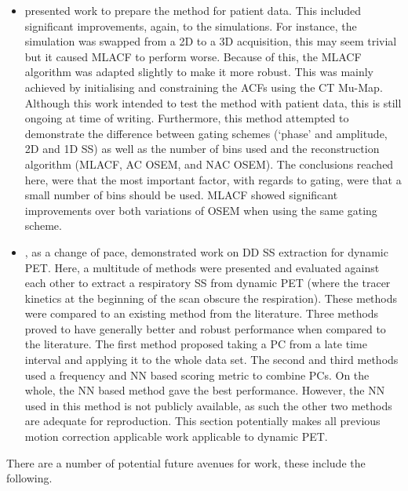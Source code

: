 \begin{itemize}
            \item {} presented work to prepare the method for patient data. This included significant improvements, again, to the simulations. For instance, the simulation was swapped from a \gls{2D} to a \gls{3D} acquisition, this may seem trivial but it caused \gls{MLACF} to perform worse. Because of this, the \gls{MLACF} algorithm was adapted slightly to make it more robust. This was mainly achieved by initialising and constraining the \glspl{ACF} using the \gls{CT} \gls{Mu-Map}. Although this work intended to test the method with patient data, this is still ongoing at time of writing. Furthermore, this method attempted to demonstrate the difference between gating schemes (`phase' and amplitude, \gls{2D} and \gls{1D} \gls{SS}) as well as the number of bins used and the reconstruction algorithm (\gls{MLACF}, \gls{AC} \gls{OSEM}, and \gls{NAC} \gls{OSEM}). The conclusions reached here, were that the most important factor, with regards to gating, were that a small number of bins should be used. \gls{MLACF} showed significant improvements over both variations of \gls{OSEM} when using the same gating scheme.

            \item {}, as a change of pace, demonstrated work on \gls{DD} \gls{SS} extraction for dynamic \gls{PET}. Here, a multitude of methods were presented and evaluated against each other to extract a respiratory \gls{SS} from dynamic \gls{PET} (where the tracer kinetics at the beginning of the scan obscure the respiration). These methods were compared to an existing method from the literature. Three methods proved to have generally better and robust performance when compared to the literature. The first method proposed taking a \gls{PC} from a late time interval and applying it to the whole data set. The second and third methods used a frequency and \gls{NN} based scoring metric to combine \glspl{PC}. On the whole, the \gls{NN} based method gave the best performance. However, the \gls{NN} used in this method is not publicly available, as such the other two methods are adequate for reproduction. This section potentially makes all previous motion correction applicable work applicable to dynamic \gls{PET}.
        \end{itemize}

        There are a number of potential future avenues for work, these include the following.

